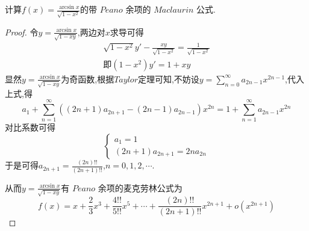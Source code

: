 \documentclass[lang=cn,newtx,10pt,scheme=chinese]{elegantbook}
\begin{document}
\begin{exercise}
    计算$f(x)=\frac{\arcsin x}{\sqrt{1-x^2}}$的带 $Peano$ 余项的 $Maclaurin$ 公式.
    \begin{proof}
    令\(y=\frac{\arcsin x}{\sqrt{1 - xy}}\),两边对\(x\)求导可得
    \begin{gather}
    \sqrt{1 - x^{2}}y'-\frac{xy}{\sqrt{1 - x^{2}}}=\frac{1}{\sqrt{1-x^2}}
    \nonumber\\
    \text{即}(1 - x^{2})y' = 1 + xy
    \nonumber
    \end{gather}
    显然$y=\frac{\arcsin x}{\sqrt{1 - xy}}$为奇函数,根据$Taylor$定理可知,不妨设\(y=\sum_{n = 0}^{\infty}a_{2n-1}x^{2n-1}\),代入上式,得
    \begin{equation}
    a_{1}+\sum_{n = 1}^{\infty}\left((2n + 1)a_{2n + 1}-(2n - 1)a_{2n - 1}\right)x^{2n}=1+\sum_{n = 1}^{\infty}a_{2n - 1}x^{2n}
    \nonumber
    \end{equation}
    对比系数可得
    \begin{equation}
    \begin{cases}a_{1}=1\\(2n + 1)a_{2n + 1}=2na_{2n}\end{cases}
    \nonumber
    \end{equation}
    于是可得\(a_{2n + 1}=\frac{(2n)!!}{(2n + 1)!!}\),\(n = 0,1,2,\cdots\).
    
    从而\(y=\frac{\arcsin x}{\sqrt{1 - xy}}\)有 $Peano$ 余项的麦克劳林公式为
    \begin{equation}
         f(x)=x+\frac{2}{3}x^{3}+\frac{4!!}{5!!}x^{5}+\cdots+\frac{(2n)!!}{(2n + 1)!!}x^{2n + 1}+o(x^{2n + 1})
        \nonumber
    \end{equation}    
    \end{proof}
\end{exercise}
\end{document}
